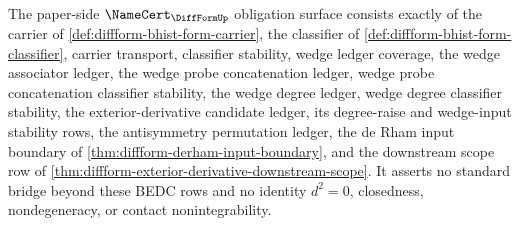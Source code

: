 \begin{theorem}
\label{thm:diffform-namecert-obligation-surface}
The paper-side $\NameCert_{\DiffFormUp}$ obligation surface consists exactly
of the carrier of \autoref{def:diffform-bhist-form-carrier}, the classifier
of \autoref{def:diffform-bhist-form-classifier}, carrier transport,
classifier stability, wedge ledger coverage, the wedge associator ledger, the
wedge probe concatenation ledger, wedge probe concatenation classifier
stability, the wedge degree ledger, wedge degree classifier stability, the
exterior-derivative candidate ledger, its degree-raise and wedge-input
stability rows, the antisymmetry permutation ledger, the de Rham input boundary of
\autoref{thm:diffform-derham-input-boundary}, and the downstream scope row of
\autoref{thm:diffform-exterior-derivative-downstream-scope}. It asserts no
standard bridge beyond these BEDC rows and no identity $d^2=0$, closedness,
nondegeneracy, or contact nonintegrability.
\end{theorem}
